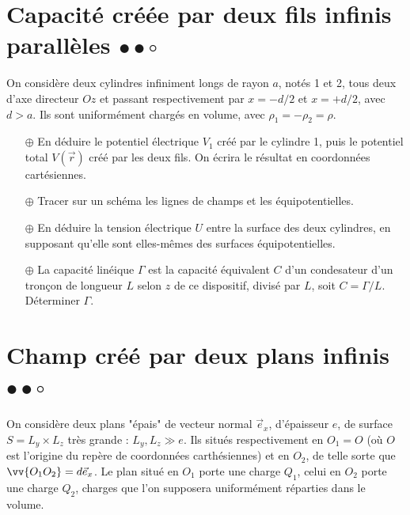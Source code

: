 \documentclass{report}
\begin{document}
\newpage

\section*{Capacité créée par deux fils infinis parallèles $\bullet\bullet\circ$}

On considère deux cylindres infiniment longs de rayon $a$, notés 1 et 2, tous deux d'axe directeur $Oz$ et passant respectivement par $x=-d/2$ et $x=+d/2$, avec $d>a$. Ils sont uniformément chargés en volume, avec $\rho_1=-\rho_2=\rho$.

\begin{itemize}

	\item[$\oplus$] En déduire le potentiel électrique $V_1$ créé par le cylindre 1, puis le potentiel total $V(\vec{r})$ créé par les deux fils. On écrira le résultat en coordonnées cartésiennes.
	
	\item[$\oplus$] Tracer sur un schéma les lignes de champs et les équipotentielles. 
	
	\item[$\oplus$] En déduire la tension électrique $U$ entre la surface des deux cylindres, en supposant qu'elle sont elles-mêmes des surfaces équipotentielles.
	
	\item[$\oplus$] La capacité linéique $\Gamma$ est la capacité équivalent $C$ d'un condesateur d'un tronçon de longueur $L$ selon $z$ de ce dispositif, divisé par $L$, soit $C=\Gamma/L$. Déterminer $\Gamma$.

\end{itemize}

\newpage

\section*{Champ créé par deux plans infinis $\bullet\bullet\circ$}

On considère deux plans "épais" de vecteur normal $\vec{e}_x$, d'épaisseur $e$, de surface $S=L_y\times L_z$ très grande : $L_y,L_z\gg e$. Ils situés respectivement en $O_1=O$ (où $O$ est l'origine du repère de coordonnées carthésiennes) et en $O_2$, de telle sorte que $\vv{O_1O_2}=d\vec{e}_x$. Le plan situé en $O_1$ porte une charge $Q_1$, celui en $O_2$ porte une charge $Q_2$, charges que l'on supposera uniformément réparties dans le volume. 
\end{document}
